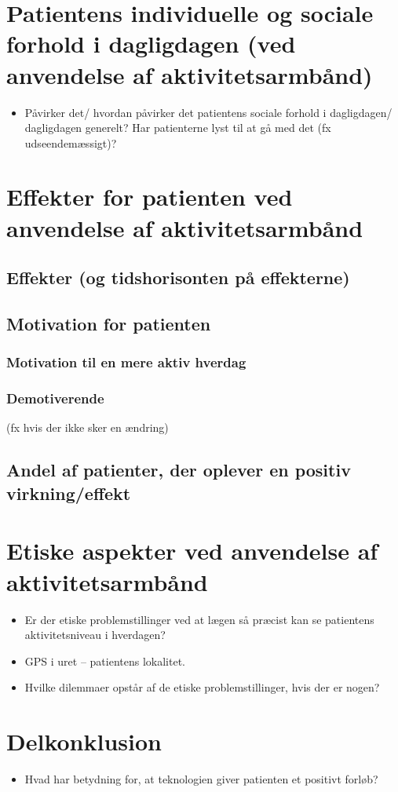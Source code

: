 \section{Patientens individuelle og sociale forhold i dagligdagen (ved anvendelse af aktivitetsarmbånd)}
\begin{itemize}
\item Påvirker det/ hvordan påvirker det patientens sociale forhold i dagligdagen/ dagligdagen generelt? Har patienterne lyst til at gå med det (fx udseendemæssigt)?
\end{itemize}

\section{Effekter for patienten ved anvendelse af aktivitetsarmbånd}
\subsection{Effekter (og tidshorisonten på effekterne)}
\subsection{Motivation for patienten}
\subsubsection{Motivation til en mere aktiv hverdag}
\subsubsection{Demotiverende}
(fx hvis der ikke sker en ændring)
\subsection{Andel af patienter, der oplever en positiv virkning/effekt}

\section{Etiske aspekter ved anvendelse af aktivitetsarmbånd}
\begin{itemize}
\item Er der etiske problemstillinger ved at lægen så præcist kan se patientens aktivitetsniveau i hverdagen?
\item GPS i uret – patientens lokalitet.
\item Hvilke dilemmaer opstår af de etiske problemstillinger, hvis der er nogen?
\end{itemize}

\section{Delkonklusion}
\begin{itemize}
\item Hvad har betydning for, at teknologien giver patienten et positivt forløb?
\end{itemize}


